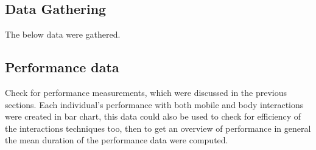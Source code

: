\subsection{Data Gathering }
The below data were gathered.

\subsection{Performance data}
Check for performance measurements, which were discussed in the previous sections. Each individual's performance with both mobile and body interactions were created in bar chart, this data could also be used to check for efficiency of the interactions techniques too, then to get an overview of performance in general the mean duration of the performance data were computed.


